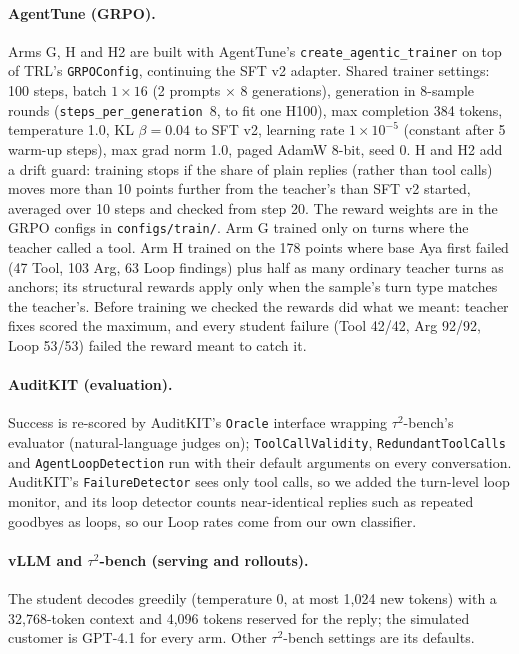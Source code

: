 \documentclass[11pt]{article}
\begin{document}
\paragraph{AgentTune (GRPO).} Arms G, H and H2 are built with AgentTune's \texttt{create\_agentic\_trainer} on top of TRL's \texttt{GRPOConfig}, continuing the SFT v2 adapter. Shared trainer settings: 100 steps, batch $1\times 16$ (2 prompts $\times$ 8 generations), generation in 8-sample rounds (\texttt{steps\_per\_generation}~8, to fit one H100), max completion 384 tokens, temperature 1.0, KL $\beta=0.04$ to SFT v2, learning rate $1\times10^{-5}$ (constant after 5 warm-up steps), max grad norm 1.0, paged AdamW 8-bit, seed 0. H and H2 add a drift guard: training stops if the share of plain replies (rather than tool calls) moves more than 10 points further from the teacher's than SFT v2 started, averaged over 10 steps and checked from step 20. The reward weights are in the GRPO configs in \texttt{configs/train/}. Arm G trained only on turns where the teacher called a tool. Arm H trained on the 178 points where base Aya first failed (47 Tool, 103 Arg, 63 Loop findings) plus half as many ordinary teacher turns as anchors; its structural rewards apply only when the sample's turn type matches the teacher's. Before training we checked the rewards did what we meant: teacher fixes scored the maximum, and every student failure (Tool 42/42, Arg 92/92, Loop 53/53) failed the reward meant to catch it.


\paragraph{AuditKIT (evaluation).} Success is re-scored by AuditKIT's \texttt{Oracle} interface wrapping $\tau^2$-bench's evaluator (natural-language judges on); \texttt{ToolCallValidity}, \texttt{RedundantToolCalls} and \texttt{AgentLoopDetection} run with their default arguments on every conversation. AuditKIT's \texttt{FailureDetector} sees only tool calls, so we added the turn-level loop monitor, and its loop detector counts near-identical replies such as repeated goodbyes as loops, so our Loop rates come from our own classifier.

\paragraph{vLLM and $\tau^2$-bench (serving and rollouts).} The student decodes greedily (temperature 0, at most 1,024 new tokens) with a 32,768-token context and 4,096 tokens reserved for the reply; the simulated customer is GPT-4.1 for every arm. Other $\tau^2$-bench settings are its defaults.
\end{document}
